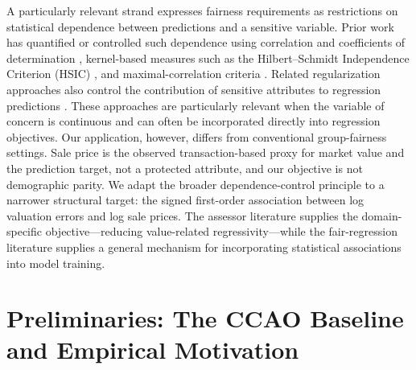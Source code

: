 \documentclass[10pt]{article}
\theoremstyle{definition}
\newcommand{\1}{\mathbf{1}}
\begin{document}
{A particularly relevant strand expresses fairness requirements as restrictions on statistical dependence between predictions and a sensitive variable.} {Prior work has quantified or controlled such dependence using correlation and coefficients of determination \cite{KomiyamaEtAl2018}, kernel-based measures such as the Hilbert--Schmidt Independence Criterion (HSIC) \cite{PerezSuayEtAl2017,LiEtAl2022Fairness}, and maximal-correlation criteria \cite{MaryEtAl2019,lee2022maximal}. Related regularization approaches also control the contribution of sensitive attributes to regression predictions \cite{ScutariPaneroProissl2022}.} 
{These approaches are particularly relevant when the variable of concern is continuous and can often be incorporated directly into regression objectives. Our application, however, differs from conventional group-fairness settings. Sale price is the observed transaction-based proxy for market value and the prediction target, not a protected attribute, and our objective is not demographic parity. We adapt the broader dependence-control principle to a narrower structural target: the signed first-order association between log valuation errors and log sale prices. The assessor literature supplies the domain-specific objective---reducing value-related regressivity---while the fair-regression literature supplies a general mechanism for incorporating statistical associations into model training.}










\section{Preliminaries: The CCAO Baseline and Empirical Motivation}
\label{sec:setting}
\end{document}
